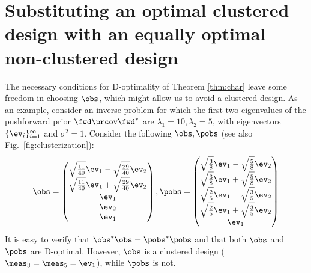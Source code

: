 \section{Substituting an optimal clustered design with an equally optimal non-clustered design}\label{section:how}
%
The necessary conditions for D-optimality of Theorem \ref{thm:char}
leave some freedom in choosing $\obs$, which might allow us to avoid a
clustered design. As an example, consider an inverse problem for which
the first two eigenvalues of the pushforward prior $\fwd \prcov\fwd^*$
are $\lambda_1 = 10, \lambda_2 = 5$, with eigenvectors
$\{\ev_i\}_{i=1}^\infty$ and $\sigma^2=1$. Consider the following
$\obs, \pobs$ (see also Fig.~\ref{fig:clusterization}):
\begin{equation}\label{eq:two_designs}
  \obs =
  \begin{pmatrix}
    \sqrt{\frac{11}{40}}\ev_1 - \sqrt{\frac{29}{40}}\ev_2 \\
    \sqrt{\frac{11}{40}}\ev_1 + \sqrt{\frac{29}{40}}\ev_2 \\
    \ev_1 \\
    \ev_2 \\
    \ev_1 \\    
  \end{pmatrix},
  \pobs =
  \begin{pmatrix}
    \sqrt{\frac{3}{8}}\ev_1 - \sqrt{\frac{5}{8}}\ev_2 \\
    \sqrt{\frac{3}{8}}\ev_1 + \sqrt{\frac{5}{8}}\ev_2 \\
    \sqrt{\frac{2}{5}}\ev_1 - \sqrt{\frac{3}{5}}\ev_2 \\
    \sqrt{\frac{2}{5}}\ev_1 + \sqrt{\frac{3}{5}}\ev_2 \\
    \ev_1 \\    
  \end{pmatrix}
\end{equation}
\noindent It is easy to verify that $\obs^*\obs = \pobs^*\pobs$
and that both $\obs$ and $\pobs$ are D-optimal. However, $\obs$
is a clustered design ($\meas_3 = \meas_5 = \ev_1$), while $\pobs$ is
not.

